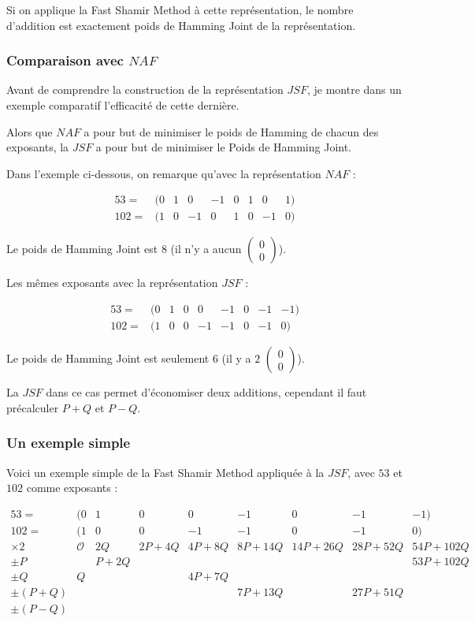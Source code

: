 \documentclass[12pt, a4paper]{memoir}
\newcommand{\doublezero}{\begin{pmatrix} 0 \\ 0 \end{pmatrix}}
\begin{document}
Si on applique la Fast Shamir Method à cette représentation, le nombre d'addition est exactement poids de Hamming Joint
de la représentation.

\subsubsection{Comparaison avec $NAF$}

Avant de comprendre la construction de la représentation $JSF$, je montre dans un exemple comparatif l'efficacité
de cette dernière.

Alors que $NAF$ a pour but de minimiser le poids de Hamming de chacun des exposants, la $JSF$ a pour but de
minimiser le Poids de Hamming Joint.

Dans l'exemple ci-dessous, on remarque qu'avec la représentation $NAF$ :

  $$\begin{array}{cccccccccc}
  53 = & (0 & 1 & 0 & -1 & 0 & 1 & 0 & 1) \\
  102 = & (1 & 0 & -1 & 0 & 1 & 0 & -1 & 0)
  \end{array}$$

  Le poids de Hamming Joint est $8$ (il n'y a aucun $\doublezero$).
  
Les mêmes exposants avec la représentation $JSF$ :

  $$\begin{array}{cccccccccc}
  53 = & (0 & 1 & 0 & 0 & -1 & 0 & -1 & -1) \\
  102 = & (1 & 0 & 0 & -1 & -1 & 0 & -1 & 0)
  \end{array}$$

  Le poids de Hamming Joint est seulement $6$ (il y a $2$ $\doublezero$).
  
  La $JSF$ dans ce cas permet d'économiser deux additions, cependant il faut précalculer $P+Q$ et $P-Q$.
  
\subsubsection{Un exemple simple}

Voici un exemple simple de la Fast Shamir Method appliquée à la $JSF$, avec $53$ et $102$ comme exposants :

  $$\begin{array}{cccccccccc}
  53  = & (0 & 1 & 0 &  0 & -1 & 0 & -1 & -1) \\
  102 = & (1 & 0 & 0 & -1 & -1 & 0 & -1 &  0) \\
  \times 2   & \mathcal{O} & 2Q   & 2P+4Q & 4P+8Q & 8P+14Q & 14P+26Q & 28P+52Q & 54P+102Q \\
  \pm P      &             & P+2Q & \,    & \,    & \,     & \,      & \,      & 53P+102Q \\
  \pm Q      & Q           & \,   & \,    & 4P+7Q & \,     & \,      & \,      & \,       \\
  \pm (P+Q)  &             & \,   & \,    & \,    & 7P+13Q & \,      & 27P+51Q & \,       \\
  \pm (P-Q)  &             & \,   & \,    & \,    & \,     & \,      & \,      & \,
  \end{array}$$
  
\end{document}
